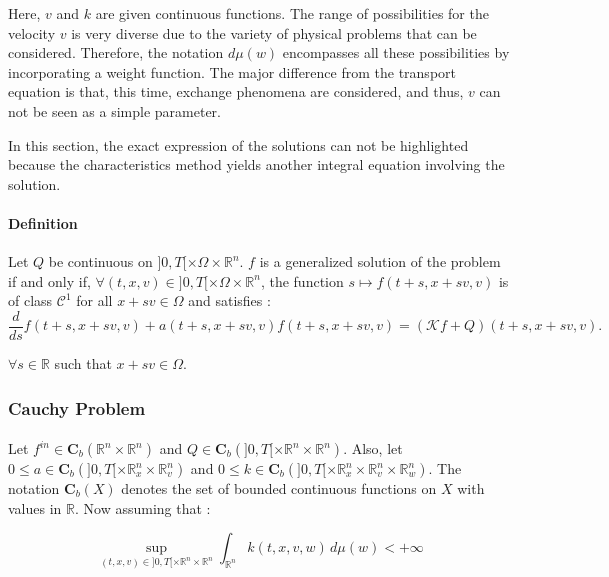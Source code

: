 \documentclass[a4paper, 11pt]{article}
\begin{document}
Here, $v$ and $k$ are given continuous functions. The range of possibilities for the velocity $v$ is very diverse due to the variety of physical problems that can be considered. Therefore, the notation $d\mu(w)$ encompasses all these possibilities by incorporating a weight function. The major difference from the transport equation is that, this time, exchange phenomena are considered, and thus, $v$ can not be seen as a simple parameter.

In this section, the exact expression of the solutions can not be highlighted because the characteristics method yields another integral equation involving the solution.


\paragraph{Definition}

Let $Q$ be continuous on $]0,T[\times \Omega \times \mathbb{R}^n$. $f$ is a generalized solution of the problem \cite{Boltzmann} if and only if, $\forall (t,x,v) \in ]0,T[\times \Omega \times \mathbb{R}^n$, the function $ s \mapsto f(t+s,x+sv,v) $	is of class $\mathcal{C}^1$ for all $x+sv \in \Omega$ and satisfies :
\[\frac{d}{ds}f(t+s,x+sv,v) +a(t+s,x+sv,v)f(t+s,x+sv,v) = (\mathcal{K}f+ Q)(t+s,x+sv,v). 
\]

\begin{flushleft} $\forall s \in \mathbb{R}$ such that $x +sv \in \Omega$.
\end{flushleft}

\subsubsection{Cauchy Problem}
\paragraph{}



Let $f^{in} \in \mathbf{C}_b(\mathbb{R}^n \times \mathbb{R}^n)$ and $Q \in \mathbf{C}_b(]0,T[ \times \mathbb{R}^n \times \mathbb{R}^n)$. Also, let $0 \leq a \in \mathbf{C}_b(]0,T[ \times \mathbb{R}_x^n \times \mathbb{R}_v^n)$ and $0 \leq k \in \mathbf{C}_b(]0,T[ \times \mathbb{R}_x^n \times \mathbb{R}_v^n \times \mathbb{R}_w^n)$. The notation $\mathbf{C}_b(X)$ denotes the set of bounded continuous functions on $X$ with values in $\mathbb{R}$.
\medbreak
Now assuming that :  

\[ \underset{(t,x,v) \in ]0,T[ \times \mathbb{R}^n \times \mathbb{R}^n}{\sup} \int_{\mathbb{R}^n} k(t,x,v,w) \, d\mu(w) < +\infty \]
\end{document}
